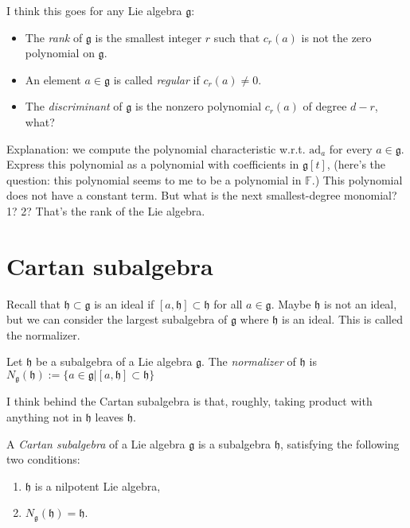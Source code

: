 \begin{definition}
\label{definition-rank}
I think this goes for any Lie algebra $\mathfrak{g}$:
\begin{itemize}
\item The {\it rank} of $\mathfrak{g}$ is
the smallest integer $r$ such that $c_r(a)$ is not the 
zero polynomial on $\mathfrak{g}$.
\item An element $a \in \mathfrak{g}$ is called {\it regular} 
if $c_r(a)\neq 0$.
\item The {\it discriminant} of $\mathfrak{g}$ is
the nonzero polynomial $c_r(a)$ of degree $d-r$, what? 
\end{itemize}
\end{definition}

Explanation: we compute the polynomial characteristic w.r.t.
$\text{ad}_a$ for every $a \in \mathfrak{g}$.
Express this polynomial as a polynomial with coefficients in $\mathfrak{g}[t]$,
(here's the question: this polynomial seems to me to be a polynomial
in $\mathbb{F}$.)
This polynomial does not have a constant term.
But what is the next smallest-degree monomial? 1? 2?
That's the rank of the Lie algebra.

\section{Cartan subalgebra}
\label{section-Cartan-subalgebra}

Recall that $\mathfrak{h}\subset\mathfrak{g}$ is an ideal
if $[a,\mathfrak{h}]\subset\mathfrak{h}$ for all $a \in \mathfrak{g}$.
Maybe $\mathfrak{h}$ is not an ideal, but we 
can consider the largest subalgebra of $\mathfrak{g}$ 
where $\mathfrak{h}$ is an ideal.
This is called the normalizer.

\begin{definition}
\label{definition-normalizer}
Let $\mathfrak{h}$ be a subalgebra of a Lie algebra $\mathfrak{g}$.
The {\it normalizer} of $\mathfrak{h}$
is 
$N_\mathfrak{g}(\mathfrak{h}):=\{a \in \mathfrak{g}
|[a,\mathfrak{h}]\subset\mathfrak{h}\}$
\end{definition}

I think behind the Cartan subalgebra is that, roughly,
taking product with
anything not in $\mathfrak{h}$ leaves $\mathfrak{h}$.

\begin{definition}
\label{definition-Cartan-subalgebra}
A {\it Cartan subalgebra} of a Lie algebra $\mathfrak{g}$ is a subalgebra
$\mathfrak{h}$, satisfying the following two conditions:
\begin{enumerate}
\item $\mathfrak{h}$ is a nilpotent Lie algebra,
\item $N_\mathfrak{g}(\mathfrak{h})=\mathfrak{h}$.
\end{enumerate}
\end{definition}

